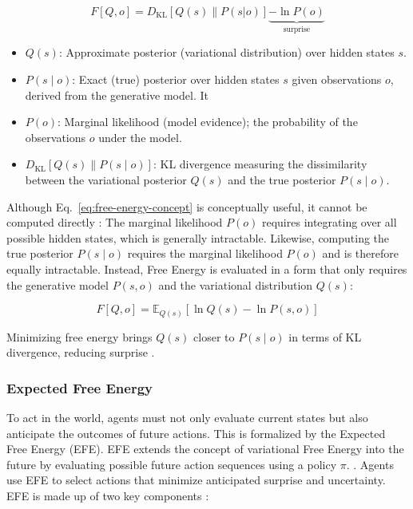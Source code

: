 \begin{equation}
F\left[Q, o\right] = D_\mathrm{KL}[Q(s) \parallel P(s|o)] \underbrace{ - \ln P(o)}_{\text{surprise}}  
\label{eq:free-energy-concept}
\end{equation}

\begin{itemize}
  \item \( Q(s) \): Approximate posterior (variational distribution) over hidden states \(s\).
  \item \( P(s \mid o) \): Exact (true) posterior over hidden states  \(s\) given observations \(o\), derived from the generative model. It 
  \item \( P(o) \): Marginal likelihood (model evidence); the probability of the observations \(o\) under the  model.
  \item \( D_\mathrm{KL}\left[ Q(s) \parallel P(s \mid o) \right] \): KL divergence measuring the dissimilarity between the variational posterior \( Q(s) \) and the true posterior \( P(s \mid o) \).
\end{itemize}

Although Eq.~\ref{eq:free-energy-concept} is conceptually useful, it cannot be computed directly \cite{smith_step-by-step_2022}: The marginal likelihood \( P(o) \) requires integrating over all possible hidden states, which is generally intractable. Likewise, computing the true posterior \( P(s \mid o) \) requires the marginal likelihood \( P(o) \) and is therefore equally intractable. Instead, Free Energy is evaluated in a form that only requires the generative model \( P(s, o) \) and the variational distribution \( Q(s) \):

\begin{equation}
F[Q, o] = \mathbb{E}_{Q(s)}[\ln Q(s) - \ln P(s, o)]
\label{eq:free-energy-computation}
\end{equation}

Minimizing free energy brings \( Q(s) \) closer to \( P(s \mid o) \) in terms of KL divergence, reducing surprise \cite{smith_step-by-step_2022}.



\subsubsection{Expected Free Energy}
To act in the world, agents must not only evaluate current states but also anticipate the outcomes of future actions. This is formalized by the Expected Free Energy (EFE). EFE extends the concept of variational Free Energy into the future by evaluating possible future action sequences using a policy \(\pi\). \cite{friston_active_2016}. Agents use EFE to select actions that minimize anticipated surprise and uncertainty. EFE is made up of two key components \cite{parr_active_2022}:

